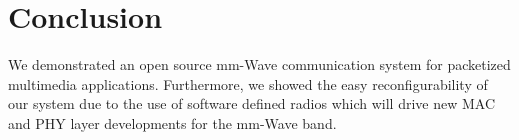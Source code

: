 \documentclass{acm_proc_article-sp}
\begin{document}
\section{Conclusion}
We demonstrated an open source mm-Wave communication system for packetized multimedia applications. Furthermore, we showed the easy reconfigurability of our system due to the use of software defined radios which will drive new MAC and PHY layer developments for the mm-Wave band.




\balancecolumns
\end{document}
